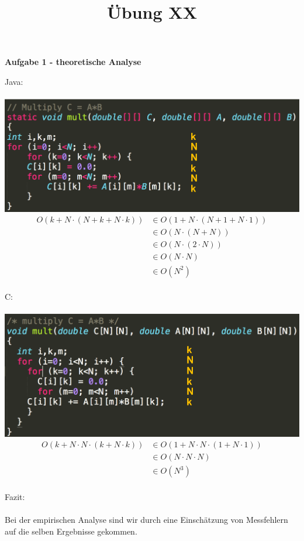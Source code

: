 \documentclass[a4paper,11pt]{scrartcl}
\title{Übung XX}
\begin{document}
\begin{center}
\LARGE{\textbf{Aufgabe 1 - theoretische Analyse}}
\end{center}
Java:\\\\
\includegraphics[width=.7\textwidth]{java.png}\\
\begin{align*}
	O(k + N\cdot (N + k+ N\cdot k))&\in O(1+N\cdot(N+1+N\cdot 1))\\
	&\in O(N\cdot(N+N))\\
	&\in O(N\cdot(2\cdot N))\\
	&\in O(N\cdot N)\\
	&\in O(N^2)
\end{align*}
\\
C:\\\\
\includegraphics[width=.7\textwidth]{c.png}\\
\begin{align*}
O(k + N\cdot N\cdot(k + N\cdot k))&\in O(1 + N\cdot N\cdot(1 + N\cdot 1))\\
&\in O(N\cdot N\cdot N)\\
&\in O(N^3)
\end{align*}
\\
Fazit:\\\\
Bei der empirischen Analyse sind wir durch eine Einschätzung von Messfehlern auf die selben Ergebnisse gekommen.
\end{document}
